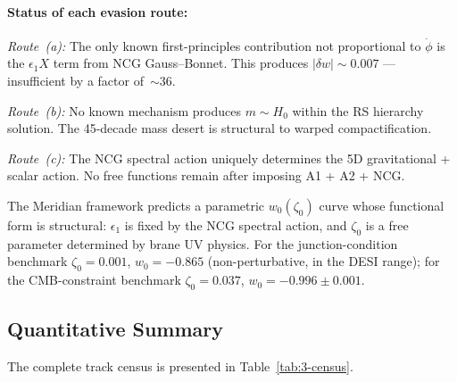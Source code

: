 \paragraph{Status of each evasion route:}

\emph{Route~(a):} The only known first-principles contribution not proportional to $\dot{\phi}$ is the $\epsilon_1 X$ term from NCG Gauss--Bonnet. This produces $|\delta w| \sim 0.007$ --- insufficient by a factor of~${\sim}36$.

\emph{Route~(b):} No known mechanism produces $m \sim H_0$ within the RS hierarchy solution. The 45-decade mass desert is structural to warped compactification.

\emph{Route~(c):} The NCG spectral action uniquely determines the 5D gravitational + scalar action. No free functions remain after imposing A1 + A2 + NCG.

\begin{corollary}
\label{cor:prediction}
The Meridian framework predicts a parametric $w_0(\zeta_0)$ curve whose functional form is structural: $\epsilon_1$ is fixed by the NCG spectral action, and $\zeta_0$ is a free parameter determined by brane UV physics. For the junction-condition benchmark $\zeta_0 = 0.001$, $w_0 = -0.865$ (non-perturbative, in the DESI range); for the CMB-constraint benchmark $\zeta_0 = 0.037$, $w_0 = -0.996 \pm 0.001$.
\end{corollary}

\subsection{Quantitative Summary}
\label{sec:3-quantsummary}

The complete track census is presented in Table~\ref{tab:3-census}.

